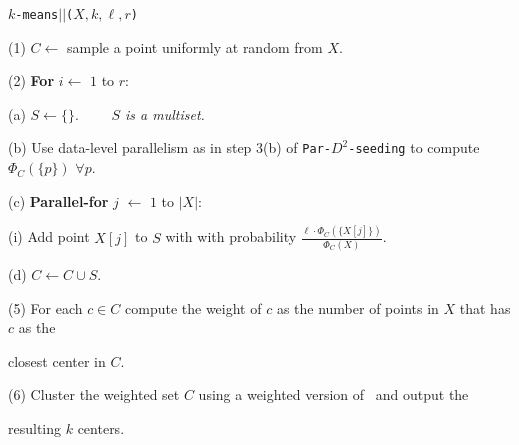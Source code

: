 \begin{center}
\begin{Algorithm}[ht]
\begin{boxedminipage}{5.6in}
{\tt $k$-means$||$($X, k, \ell, r$)}

\hspace{0.1in} (1) $C \leftarrow $ sample a point uniformly at random from $X$.

\hspace{0.1in} (2) {\bf For} $i \leftarrow $ $1$ to $r$:

\hspace{0.3in} (a) $S \leftarrow \{\}$. \ \ \ \ {\it $S$ is a multiset.}

\hspace{0.3in} (b) Use data-level parallelism as in step 3(b) of {\tt Par-$D^2$-seeding} to compute $\Phi_C(\{p\})$ $\forall p$.

\hspace{0.3in} (c) {\bf Parallel-for} $j$ $\leftarrow$ $1$ to $|X|$:
 
 \hspace{0.5in} (i) Add point $X[j]$ to $S$ with with probability  $\frac{\ell \cdot \Phi_{C}\left( \{X[j]\}\right)}{\Phi_C(X)}$.

\hspace{0.3in} (d) $C \leftarrow C \cup S$.

\hspace{0.1in} (5) For each $c \in C$ compute the weight of $c$ as the number of points in $X$ that has $c$ as the

\hspace{0.3in}  closest center in $C$.

\hspace{0.1in} (6) Cluster the weighted set $C$ using a weighted version of \kmpp\ and output the 

\hspace{0.3in} resulting $k$ centers.
\end{boxedminipage}
\caption{The {\tt $k$-means$||$} algorithm customized for our parallel setting. Recommended values~\cite{bahmani} of $\ell$ and $r$ are $\ell = 2k$ and $r=5$. $M$ indicates the number of parallel threads available.}
\label{fig:scalable}
\end{Algorithm}
\end{center}

\vspace{-0.5in}

